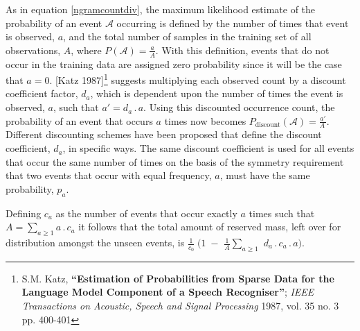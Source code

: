 
As in equation \ref{ngramcountdiv}, the maximum likelihood estimate of
the probability of an event $\mathcal{A}$ occurring is defined by the
number of times that event is observed, $a$, and the total number of
samples in the training set of all observations, $A$, where
$P(\mathcal{A}) = \frac{a}{A}$.  With this definition, events that do
not occur in the training data are assigned zero probability since it
will be the case that $a=0$.  [Katz 1987]\footnote{S.M. Katz,
\textbf{``Estimation of Probabilities from Sparse Data for the
Language Model Component of a Speech Recogniser''}; \textit{IEEE
Transactions on Acoustic, Speech and Signal Processing} 1987, vol. 35
no. 3 pp. 400-401} suggests multiplying each observed count by a discount
coefficient factor, $d_a$, which is dependent upon the number of times
the event is observed, $a$, such that $a' = d_a \,.\, a$.
Using this discounted occurrence count, the probability of an event
that occurs $a$ times now becomes
$P_\mathrm{discount}(\mathcal{A}) = \frac{a'}{A\,}$.
Different discounting schemes have been proposed that define the
discount coefficient, $d_a$, in specific ways. The same discount
coefficient is used for all events that occur the same number of
times on the basis of the symmetry requirement that two events that
occur with equal frequency, $a$, must have the same probability, $p_a$.

Defining $c_a$ as the number of events that occur exactly $a$ times
such that $A = \sum_{a\ge 1} a\,.\,c_a$ %
it follows that the total amount of
reserved mass, left over for distribution amongst the unseen events,
is 
$\frac{1}{c_0} \; ( 1\;-$ $\frac{1}{A}\sum_{a\ge 1}$ $d_a\,.\,c_a\,.\,a)$.

